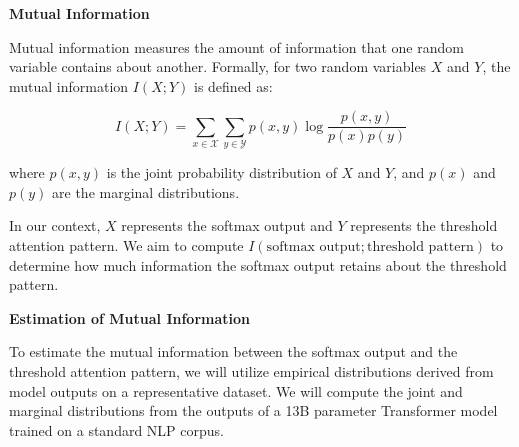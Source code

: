 \textbf{Mutual Information}













Mutual information measures the amount of information that one random variable contains about another. Formally, for two random variables \(X\) and \(Y\), the mutual information \(I(X; Y)\) is defined as:






\begin{equation}






I(X; Y) = \sum_{x \in \mathcal{X}} \sum_{y \in \mathcal{Y}} p(x, y) \log \frac{p(x, y)}{p(x)p(y)}






\end{equation}






where \(p(x, y)\) is the joint probability distribution of \(X\) and \(Y\), and \(p(x)\) and \(p(y)\) are the marginal distributions.













In our context, \(X\) represents the softmax output and \(Y\) represents the threshold attention pattern. We aim to compute \(I(\text{softmax output}; \text{threshold pattern})\) to determine how much information the softmax output retains about the threshold pattern.













\textbf{Estimation of Mutual Information}













To estimate the mutual information between the softmax output and the threshold attention pattern, we will utilize empirical distributions derived from model outputs on a representative dataset. We will compute the joint and marginal distributions from the outputs of a 13B parameter Transformer model trained on a standard NLP corpus.













